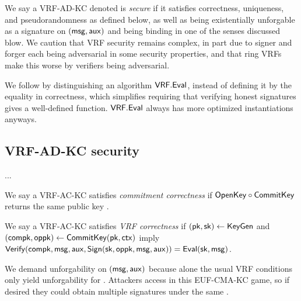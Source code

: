 

We say a VRF-AD-KC denoted \VRF is {\em secure} if it satisfies
 correctness, uniqueness, and pseudorandomness as defined below,
 as well as being existentially unforgable as a signature on $(\mathsf{msg},\mathsf{aux})$
 and being binding in one of the senses discussed blow.
We caution that VRF security remains complex, in part due to
signer and forger each being adversarial in some security properties,
and that ring VRFs make this worse by verifiers being adversarial.

We follow \cite{agg_dkg} by distinguishing an algorithm ${\mathsf{VRF}}.{\mathsf{Eval}}$,
 instead of defining it by the equality in correctness,
which simplifies requiring that verifying honest signatures gives a well-defined function.
${\mathsf{VRF}}.{\mathsf{Eval}}$ always has more optimized instantiations anyways.


\subsection{VRF-AD-KC security}

...

\begin{definition}
We say a VRF-AC-KC satisfies {\em commitment correctness} if
 ${\mathsf{OpenKey}} \circ {\ensuremath{\mathsf{CommitKey}}}$ returns the same public key \pk.
\end{definition}

\begin{definition}
We say a VRF-AC-KC satisfies {\em VRF correctness} if
$(\mathsf{pk},\mathsf{sk}) \leftarrow {\ensuremath{\mathsf{KeyGen}}}$ and $(\mathsf{compk},\mathsf{oppk}) \leftarrow {\ensuremath{\mathsf{CommitKey}}}(\mathsf{pk},\mathsf{ctx})$
imply
${\mathsf{Verify}}(\mathsf{compk},\mathsf{msg},\mathsf{aux},{\mathsf{Sign}}(\mathsf{sk},\mathsf{oppk},\mathsf{msg},\mathsf{aux})) = {\mathsf{Eval}}(\mathsf{sk},\mathsf{msg})$.
\end{definition}

We demand unforgability on $(\mathsf{msg},\mathsf{aux})$ because alone
 the usual VRF conditions only yield unforgability for \msg.
Attackers access \CommitKey in this EUF-CMA-KC game, so if desired
 they could obtain multiple signatures under the same \compk.

